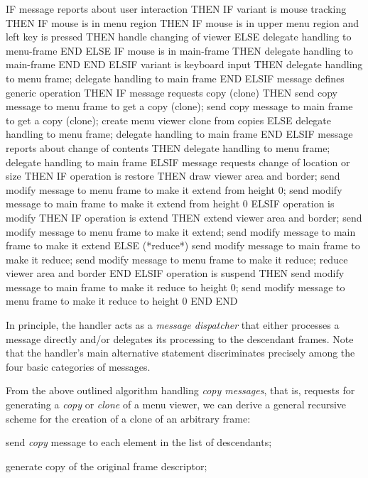 IF message reports about user interaction THEN
  IF variant is mouse tracking THEN
    IF mouse is in menu region THEN
      IF mouse is in upper menu region and left key is pressed THEN
        handle changing of viewer
      ELSE delegate handling to menu-frame
      END
    ELSE
      IF mouse is in main-frame THEN delegate handling to main-frame END
    END
  ELSIF variant is keyboard input THEN
    delegate handling to menu frame;
    delegate handling to main frame
  END
ELSIF message defines generic operation THEN
  IF message requests copy (clone) THEN
    send copy message to menu frame to get a copy (clone);
    send copy message to main frame to get a copy (clone);
    create menu viewer clone from copies
  ELSE
    delegate handling to menu frame; delegate handling to main frame
  END
ELSIF message reports about change of contents THEN
  delegate handling to menu frame;
  delegate handling to main frame
ELSIF message requests change of location or size THEN
  IF operation is restore THEN
    draw viewer area and border;
    send modify message to menu frame to make it extend from height 0;
    send modify message to main frame to make it extend from height 0
  ELSIF operation is modify THEN
    IF operation is extend THEN
      extend viewer area and border;
      send modify message to menu frame to make it extend;
      send modify message to main frame to make it extend
    ELSE (*reduce*)
      send modify message to main frame to make it reduce;
      send modify message to menu frame to make it reduce;
      reduce viewer area and border
    END
  ELSIF operation is suspend THEN
    send modify message to main frame to make it reduce to height 0;
    send modify message to menu frame to make it reduce to height 0
  END
END
\endtt

\noindent In principle, the handler acts as a {\it message dispatcher\/} that
either processes a message directly and/or delegates its processing to
the descendant frames. Note that the handler's main alternative
statement discriminates precisely among the four basic categories of
messages.

From the above outlined algorithm handling {\it copy messages\/}, that
is, requests for generating a {\it copy\/} or {\it clone\/} of a menu
viewer, we can derive a general recursive scheme for the creation of a
clone of an arbitrary frame:

send {\it copy\/} message to each element in the list of descendants;

generate copy of the original frame descriptor;

